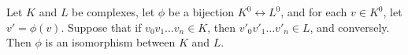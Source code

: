 Let $K$ and $L$ be complexes, let $\phi$ be a bijection $K^0 \leftrightarrow L^0$, and for each $v \in K^0$, let $v' = \phi(v)$. Suppose that if $v_0v_1\ldots v_n \in K$, then $v'_0v'_1\ldots v'_n \in L$, and conversely. Then $\phi$ is an isomorphism between $K$ and $L$.
